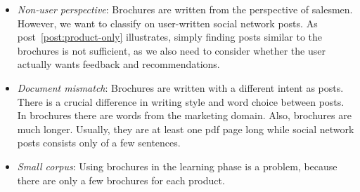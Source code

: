  \begin{itemize}
 	\item
		\emph{Non-user perspective}:
		Brochures are written from the perspective of salesmen.
		However, we want to classify on user-written social network posts.
		As post~\ref{post:product-only} illustrates, simply finding posts similar to the brochures is not sufficient, as we also need to consider whether the user actually wants feedback and recommendations.
	\item
		\emph{Document mismatch}:
		Brochures are written with a different intent as posts.
		There is a crucial difference in writing style and word choice between posts.
		In brochures there are words from the marketing domain.
		Also, brochures are much longer.
		Usually, they are at least one pdf page long while social network posts consists only of a few sentences.
	\item
		\emph{Small corpus}:
		Using brochures in the learning phase is a problem, because there are only a few brochures for each product.
 \end{itemize}
